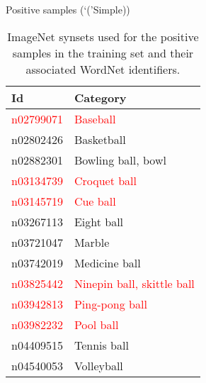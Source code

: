 \documentclass{beamer}
\newcommand{\scarequotes}[1]{`#1'}
\begin{document}
\begin{frame}{Positive samples (\scarequotes(Simple))}
	\begin{table}[H]
		\footnotesize
		\centering
		\caption{ImageNet synsets used for the positive samples in the training set and their associated WordNet \citep{fellbaum1998wordnet} identifiers.}
		\label{tab:postraining}
		\begin{tabularx}{\textwidth}{lX}
			\toprule
			\textbf{Id} & \textbf{Category} \\
			\midrule
			\textcolor{red}{n02799071} & \textcolor{red}{Baseball} \\
			n02802426 & Basketball \\
			n02882301 & Bowling ball, bowl \\
			\textcolor{red}{n03134739} & \textcolor{red}{Croquet ball} \\
			\textcolor{red}{n03145719} & \textcolor{red}{Cue ball} \\
			n03267113 & Eight ball \\
			n03721047 & Marble \\
			n03742019 & Medicine ball \\
			\textcolor{red}{n03825442} & \textcolor{red}{Ninepin ball, skittle ball} \\
			\textcolor{red}{n03942813} & \textcolor{red}{Ping-pong ball} \\
			\textcolor{red}{n03982232} & \textcolor{red}{Pool ball} \\
			n04409515 & Tennis ball \\
			n04540053 & Volleyball \\
			\bottomrule
		\end{tabularx}
	\end{table}
\end{frame}

\end{document}

